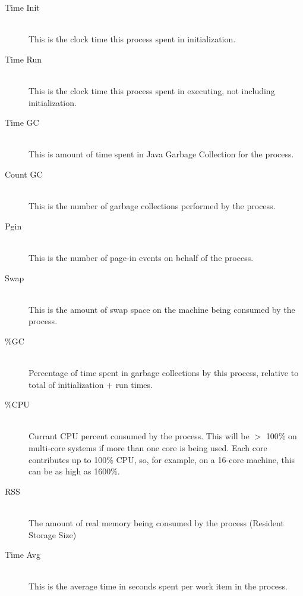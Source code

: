 \begin{description}
          \item[Time Init] \hfill \\
            This is the clock time this process spent in initialization.
            
          \item[Time Run] \hfill \\
            This is the clock time this process spent in executing, not including
            initialization.
            
          \item[Time GC] \hfill \\
            This is amount of time spent in Java Garbage Collection for the process.
            
          \item[Count GC] \hfill \\
            This is the number of garbage collections performed by the process.
            
          \item[Pgin] \hfill \\
            This is the number of page-in events on behalf of the process.

          \item[Swap] \hfill \\
            This is the amount of swap space on the machine being consumed by the process.

          \item[\%GC] \hfill \\
            Percentage of time spent in garbage collections by this process, relative to total of
            initialization + run times.
            
          \item[\%CPU] \hfill \\
            Currant CPU percent consumed by the process.  This will be $>$ 100\% on 
            multi-core systems if more than one core is being used.  Each core contributes
            up to 100\% CPU, so, for example, on a 16-core machine, this can be as high
            as 1600\%.
            
          \item[RSS] \hfill \\
            The amount of real memory being consumed by the process (Resident Storage Size)
            
          \item[Time Avg] \hfill \\
            This is the average time in seconds spent per work item in the process.
            

\end{description}
